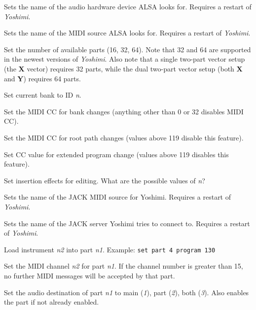       Sets the name of the audio hardware device ALSA looks for.
      Requires a restart of \textsl{Yoshimi}.

      Sets the name of the MIDI source ALSA looks for.
      Requires a restart of \textsl{Yoshimi}.

      Set the number of available parts (16, 32, 64).
      Note that 32 and 64 are supported in the newest versions of
      \textsl{Yoshimi}.  Also note that a single two-part vector setup (the
      \textbf{X} vector) requires 32 parts, while the dual two-part vector
      setup (both \textbf{X} and \textbf{Y}) requires 64 parts.

      Set current bank to ID \textsl{n}.

      Set the MIDI CC for bank changes (anything other than 0 or 32
      disables MIDI CC).

      Set the MIDI CC for root path changes (values above 119 disable this
      feature).

      Set CC value for extended program change (values above 119 disables this
      feature).

      Set insertion effects for editing.
      What are the possible values of \textsl{n}?

      Sets the name of the JACK MIDI source for Yoshimi.
      Requires a restart of \textsl{Yoshimi}.

      Sets the name of the JACK server Yoshimi tries to connect to.
      Requires a restart of \textsl{Yoshimi}.

      Load instrument \textsl{n2} into part \textsl{n1}.
      Example: \texttt{set part 4 program 130}

      Set the MIDI channel \textsl{n2} for part \textsl{n1}.
      If the channel number is greater than 15, no further MIDI
      messages will be accepted by that part.

      Set the audio destination of part \textsl{n1}
      to main (\textsl{1}), part (\textsl{2}), both (\textsl{3}).
      Also enables the part if not already enabled.

